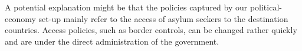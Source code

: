 \documentclass[a4paper,12pt]{article}
\begin{document}
   A potential explanation might be that the policies captured by our political-economy set-up mainly refer to the access of asylum seekers to the destination countries. Access policies, such as border controls, can be changed rather quickly and are under the direct administration of the government. 
   



 
\end{document}

